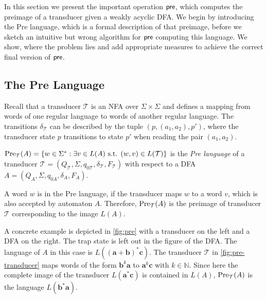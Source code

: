 In this section we present the important operation $\operatorname{\textsf{pre}}$, which computes the preimage of a transducer given a weakly acyclic DFA. We begin by introducing the Pre language, which is a formal description of that preimage, before we sketch an intuitive but wrong algorithm for $\operatorname{\textsf{pre}}$ computing this language. We show, where the problem lies and add appropriate measures to achieve the correct final version of $\operatorname{\textsf{pre}}$.

\subsection{The Pre Language}\label{sec:pre_theory}
Recall that a transducer $\mathcal{T}$ is an NFA over $\Sigma \times \Sigma$ and defines a mapping from words of one regular language to words of another regular language. The transitions $\delta_{\mathcal{T}}$ can be described by the tuple $(p,(a_{1},a_{2}),p')$, where the transducer state $p$ transitions to state $p'$ when reading the pair $(a_{1},a_{2})$.

\begin{definition}\label{def:pre}
$\operatorname{\text{Pre}}_{\mathcal{T}}(A) = \{ w \in \Sigma^{*}: \exists  v \in L(A) \text{ s.t. } (w,v) \in L(\mathcal{T}) \}$
is the \emph{Pre language} of a transducer $\mathcal{T} = (Q_{\mathcal{T}},\Sigma,q_{0\mathcal{T}},\delta_{\mathcal{T}},F_{\mathcal{T}})$ with respect to a DFA $A = (Q_{A},\Sigma,q_{0A}, \delta_{A}, F_{A})$. 
\end{definition}

A word $w$ is in the Pre language, if the transducer maps $w$ to a word $v$, which is also accepted by automaton $A$.
Therefore, $\operatorname{\text{Pre}}_{\mathcal{T}}(A)$ is the preimage of transducer $\mathcal{T}$ corresponding to the image $L(A)$. 

\par

A concrete example is depicted in \autoref{fig:pre} with a transducer on the left and a DFA on the right. The trap state is left out in the figure of the DFA. The language of $A$ in this case is $L(\bm{(a+b)^{*}c})$. The transducer $\mathcal{T}$ in \autoref{fig:pre-transducer} maps words of the form $\bm{b}^{k}\bm{a}$ to $\bm{a}^{k}\bm{c}$ with $k \in \mathbb{N}$. 
Since here the complete image of the transducer $L(\bm{a^{*}c})$ is contained in $L(A)$, $\operatorname{\text{Pre}}_{\mathcal{T}}(A)$ is the language $L(\bm{b^{*}a})$. 

